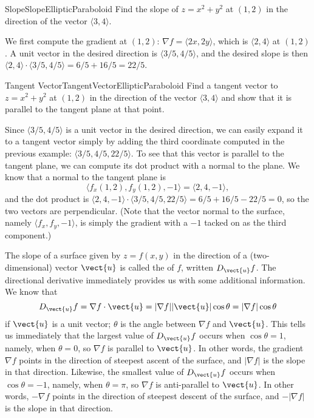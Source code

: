 \begin{example}{Slope}{SlopeEllipticParaboloid}
Find the slope of $z=x^2+y^2$ at $(1,2)$ in the direction of the
vector $\langle 3,4\rangle$.
\end{example}
\begin{solution}
We first compute the gradient at $(1,2)$:
$\nabla f=\langle 2x,2y\rangle$, which is $\langle 2,4\rangle$ at
$(1,2)$. A unit vector in the desired direction is $\langle
3/5,4/5\rangle$, and the desired slope is then
$\langle 2,4\rangle\cdot\langle 3/5,4/5\rangle=6/5+16/5=22/5$.
\end{solution}

\begin{example}{Tangent Vector}{TangentVectorEllipticParaboloid}
Find a tangent vector to $z=x^2+y^2$ at $(1,2)$ in the direction of the
vector $\langle 3,4\rangle$ and show that it is parallel to the
tangent plane at that point.
\end{example}
\begin{solution}
Since $\langle 3/5,4/5\rangle$ is a unit vector in the desired
direction, we can easily expand it to a tangent vector simply by
adding the third coordinate computed in the previous example: $\langle
3/5,4/5,22/5\rangle$.  To see that this vector is parallel to the
tangent plane, we can compute its dot product with a normal to the
plane. We know that a normal to the tangent plane is
$$\langle f_x(1,2),f_y(1,2),-1\rangle = \langle 2,4,-1\rangle,$$
and the dot product is $\langle 2,4,-1\rangle\cdot\langle
3/5,4/5,22/5\rangle=6/5+16/5-22/5=0$, so the two vectors are
perpendicular. (Note that the vector normal to the surface, namely 
$\langle f_x,f_y,-1\rangle$, is simply the gradient with a $-1$ tacked
on as the third component.)
\end{solution}

The slope of a surface given by $z=f(x,y)$ in the direction of a
(two-dimensional) vector $\vect{u}$ is called the  of $f$, written $D_{\vect{u}}f$.
The directional derivative immediately provides us with some
additional information. We know that 
$$D_{\vect{u}}f=\nabla f\cdot \vect{u}=|\nabla f||\vect{u}|\cos\theta=
|\nabla f|\cos\theta$$
if $\vect{u}$ is a unit vector; $\theta$ is the angle between $\nabla f$
and $\vect{u}$. This tells us immediately that the largest value of
$D_{\vect{u}}f$ occurs when $\cos\theta=1$, namely, when $\theta=0$, so 
$\nabla f$ is parallel to $\vect{u}$. In other words, the gradient
$\nabla f$ points in the direction of steepest ascent of the surface, and 
$|\nabla f|$ is the slope in that direction. Likewise, the smallest value of
$D_{\vect{u}}f$ occurs when $\cos\theta=-1$, namely, when $\theta=\pi$, so 
$\nabla f$ is anti-parallel to $\vect{u}$. In other words, 
$-\nabla f$ points in the direction of steepest descent of the surface, and 
$-|\nabla f|$ is the slope in that direction.

